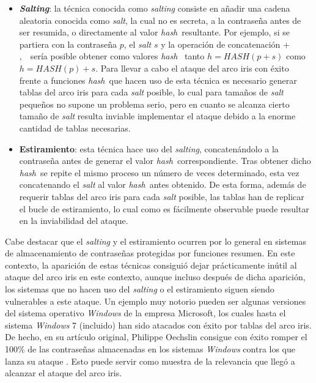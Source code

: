 \documentclass[12pt,spanish,listoffigures,listoftables,listofalgorithms]{tfgetsinf}
\newcommand{\hash}{\textit{hash}}
\begin{document}
\begin{itemize}

    \item \textbf{\textit{Salting}}: la técnica conocida como \textit{salting} consiste en añadir una cadena aleatoria conocida como \textit{salt}, la cual no es secreta, a la contraseña antes de ser resumida, o directamente al valor \hash~resultante. Por ejemplo, si se partiera con la contraseña $p$, el \textit{salt} $s$ y la operación de concatenación $+$,~~sería posible obtener como valores \hash~ tanto $h = HASH(p+s)$ como $h = HASH(p)+s$. Para llevar a cabo el ataque del arco iris con éxito frente a funciones \hash~que hacen uso de esta técnica es necesario generar tablas del arco iris para cada \textit{salt} posible, lo cual para tamaños de \textit{salt} pequeños no supone un problema serio, pero en cuanto se alcanza cierto tamaño de \textit{salt} resulta inviable implementar el ataque debido a la enorme cantidad de tablas necesarias.
    
    \item \textbf{Estiramiento}: esta técnica hace uso del \textit{salting}, concatenándolo a la contraseña antes de generar el valor \hash~correspondiente. Tras obtener dicho \hash~se repite el mismo proceso un número de veces determinado, esta vez concatenando el \textit{salt} al valor \hash~antes obtenido. De esta forma, además de requerir tablas del arco iris para cada \textit{salt} posible, las tablas han de replicar el bucle de estiramiento, lo cual como es fácilmente observable puede resultar en la inviabilidad del ataque.
    
\end{itemize}

Cabe destacar que el \textit{salting} y el estiramiento ocurren por lo general en sistemas de almacenamiento de contraseñas protegidas por funciones resumen. En este contexto, la aparición de estas técnicas consiguió dejar prácticamente inútil al ataque del arco iris en este contexto, aunque incluso después de dicha aparición, los sistemas que no hacen uso del \textit{salting} o el estiramiento siguen siendo vulnerables a este ataque. Un ejemplo muy notorio pueden ser algunas versiones del sistema operativo \textit{Windows} de la empresa Microsoft, los cuales hasta el sistema \textit{Windows} 7 (incluido) han sido atacados con éxito por tablas del arco iris. De hecho, en su artículo original, Philippe Oechslin consigue con éxito romper el 100\% de las contraseñas almacenadas en los sistemas \textit{Windows} contra los que lanza su ataque \cite{rainbow}. Esto puede servir como muestra de la relevancia que llegó a alcanzar el ataque del arco iris.
\end{document}
